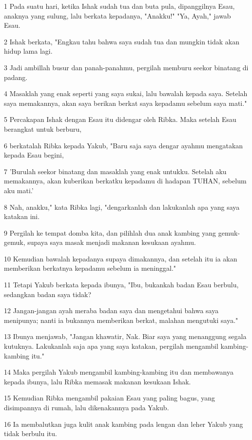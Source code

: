 \par 1 Pada suatu hari, ketika Ishak sudah tua dan buta pula, dipanggilnya Esau, anaknya yang sulung, lalu berkata kepadanya, "Anakku!" "Ya, Ayah," jawab Esau.
\par 2 Ishak berkata, "Engkau tahu bahwa saya sudah tua dan mungkin tidak akan hidup lama lagi.
\par 3 Jadi ambillah busur dan panah-panahmu, pergilah memburu seekor binatang di padang.
\par 4 Masaklah yang enak seperti yang saya sukai, lalu bawalah kepada saya. Setelah saya memakannya, akan saya berikan berkat saya kepadamu sebelum saya mati."
\par 5 Percakapan Ishak dengan Esau itu didengar oleh Ribka. Maka setelah Esau berangkat untuk berburu,
\par 6 berkatalah Ribka kepada Yakub, "Baru saja saya dengar ayahmu mengatakan kepada Esau begini,
\par 7 'Burulah seekor binatang dan masaklah yang enak untukku. Setelah aku memakannya, akan kuberikan berkatku kepadamu di hadapan TUHAN, sebelum aku mati.'
\par 8 Nah, anakku," kata Ribka lagi, "dengarkanlah dan lakukanlah apa yang saya katakan ini.
\par 9 Pergilah ke tempat domba kita, dan pilihlah dua anak kambing yang gemuk-gemuk, supaya saya masak menjadi makanan kesukaan ayahmu.
\par 10 Kemudian bawalah kepadanya supaya dimakannya, dan setelah itu ia akan memberikan berkatnya kepadamu sebelum ia meninggal."
\par 11 Tetapi Yakub berkata kepada ibunya, "Ibu, bukankah badan Esau berbulu, sedangkan badan saya tidak?
\par 12 Jangan-jangan ayah meraba badan saya dan mengetahui bahwa saya menipunya; nanti ia bukannya memberikan berkat, malahan mengutuki saya."
\par 13 Ibunya menjawab, "Jangan khawatir, Nak. Biar saya yang menanggung segala kutuknya. Lakukanlah saja apa yang saya katakan, pergilah mengambil kambing-kambing itu."
\par 14 Maka pergilah Yakub mengambil kambing-kambing itu dan membawanya kepada ibunya, lalu Ribka memasak makanan kesukaan Ishak.
\par 15 Kemudian Ribka mengambil pakaian Esau yang paling bagus, yang disimpannya di rumah, lalu dikenakannya pada Yakub.
\par 16 Ia membalutkan juga kulit anak kambing pada lengan dan leher Yakub yang tidak berbulu itu.

